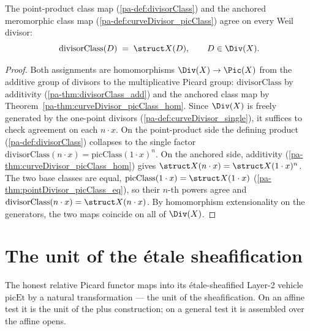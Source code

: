 \begin{theorem}
  \label{pa-thm:divisorClass_eq_picClass}
  \leanok

  The point-product class map (\ref{pa-def:divisorClass}) and the anchored meromorphic class map
  (\ref{pa-def:curveDivisor_picClass}) agree on every Weil divisor:
  \[
    \mathrm{divisorClass}(D) \;=\; \struct X(D), \qquad D \in \Div(X).
  \]
\end{theorem}
\begin{proof}
  \leanok
  Both assignments are homomorphisms \(\Div(X) \to \Pic(X)\) from the additive group of divisors to
  the multiplicative Picard group: \(\mathrm{divisorClass}\) by additivity
  (\ref{pa-thm:divisorClass_add}) and the anchored class map by
  Theorem~\ref{pa-thm:curveDivisor_picClass_hom}. Since \(\Div(X)\) is freely generated by the
  one-point divisors (\ref{pa-def:curveDivisor_single}), it suffices to check agreement on each
  \(n \cdot x\). On the point-product side the defining product (\ref{pa-def:divisorClass}) collapses
  to the single factor \(\mathrm{divisorClass}(n \cdot x) = \mathrm{picClass}(1 \cdot x)^{n}\). On
  the anchored side, additivity (\ref{pa-thm:curveDivisor_picClass_hom}) gives \(\struct X(n \cdot x) =
  \struct X(1 \cdot x)^{n}\). The two base classes are equal, \(\mathrm{picClass}(1 \cdot x) =
  \struct X(1 \cdot x)\) (\ref{pa-thm:pointDivisor_picClass_eq}), so their \(n\)-th powers agree and
  \(\mathrm{divisorClass}(n \cdot x) = \struct X(n \cdot x)\). By homomorphism extensionality on the
  generators, the two maps coincide on all of \(\Div(X)\).
\end{proof}

\section{The unit of the \'etale sheafification}
\label{pa-sec:picEtUnit}

The honest relative Picard functor maps into its \'etale-sheafified Layer-2 vehicle
\(\mathrm{picEt}\) by a natural transformation — the unit of the sheafification. On an affine
test it is the unit of the plus construction; on a general test it is assembled over the
affine opens.

